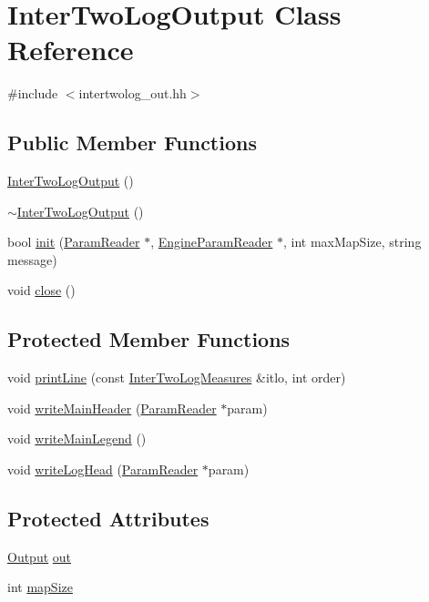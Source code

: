 \hypertarget{classInterTwoLogOutput}{
\section{InterTwoLogOutput Class Reference}
\label{classInterTwoLogOutput}
}


{\ttfamily \#include $<$intertwolog\_\-out.hh$>$}

\subsection*{Public Member Functions}
\begin{DoxyCompactItemize}
\item 
\hyperlink{classInterTwoLogOutput_a22e75592762dfde6d82bc911aa810354}{InterTwoLogOutput} ()
\item 
\hyperlink{classInterTwoLogOutput_a6e6f407ccb2ae032b2758f9d1331a798}{$\sim$InterTwoLogOutput} ()
\item 
bool \hyperlink{classInterTwoLogOutput_a6bf1b2c7e2f158d2484cafaf08ff4a7c}{init} (\hyperlink{classParamReader}{ParamReader} $\ast$, \hyperlink{classEngineParamReader}{EngineParamReader} $\ast$, int maxMapSize, string message)
\item 
void \hyperlink{classInterTwoLogOutput_a81ed7b00f76b57d81bc4e504d9f36c66}{close} ()
\end{DoxyCompactItemize}
\subsection*{Protected Member Functions}
\begin{DoxyCompactItemize}
\item 
void \hyperlink{classInterTwoLogOutput_ae4cccc1f183d1d224e77360d00b9f3b9}{printLine} (const \hyperlink{structInterTwoLogMeasures}{InterTwoLogMeasures} \&itlo, int order)
\item 
void \hyperlink{classInterTwoLogOutput_ac8520bd89a481e5c17cffc75cde31671}{writeMainHeader} (\hyperlink{classParamReader}{ParamReader} $\ast$param)
\item 
void \hyperlink{classInterTwoLogOutput_a5cc1b8305c6233048ec3b4274a2323e2}{writeMainLegend} ()
\item 
void \hyperlink{classInterTwoLogOutput_a4856f3d92e9d3c691f991797825d1bcc}{writeLogHead} (\hyperlink{classParamReader}{ParamReader} $\ast$param)
\end{DoxyCompactItemize}
\subsection*{Protected Attributes}
\begin{DoxyCompactItemize}
\item 
\hyperlink{classOutput}{Output} \hyperlink{classInterTwoLogOutput_a66141117813508a67681b020e5113e7e}{out}
\item 
int \hyperlink{classInterTwoLogOutput_abb92f43d8630b9695545b28fdece04f5}{mapSize}
\end{DoxyCompactItemize}
